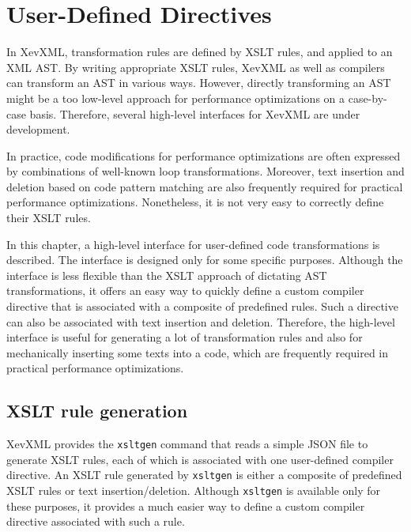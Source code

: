 \chapter{User-Defined Directives}\label{chap:json}


In XevXML, transformation rules are defined by XSLT rules, and applied
to an XML AST. By writing appropriate XSLT rules, XevXML as well as
compilers can transform an AST in various ways.  However, directly
transforming an AST might be a too low-level approach for performance
optimizations on a case-by-case basis.  Therefore, several high-level
interfaces for XevXML are under development.

In practice, code modifications for performance optimizations are often
expressed by combinations of well-known loop transformations.  Moreover,
text insertion and deletion based on code pattern matching are also
frequently required for practical performance optimizations.
Nonetheless, it is not very easy to correctly define their XSLT
rules. 

In this chapter, a high-level interface for user-defined code
transformations is described. The interface is designed only for some
specific purposes.  Although the interface is less flexible than the
XSLT approach of dictating AST transformations, it offers an easy way to
quickly define a custom compiler directive that is associated with a
composite of predefined rules. Such a directive can also be associated
with text insertion and deletion. Therefore, the high-level interface is
useful for generating a lot of transformation rules and also for
mechanically inserting some texts into a code, which are frequently
required in practical performance optimizations.

\section{XSLT rule generation}
XevXML provides the \texttt{xsltgen} command that reads a simple
JSON\cite{json} file to generate XSLT rules, each of which is associated
with one user-defined compiler directive.  An XSLT rule generated by
\texttt{xsltgen} is either a composite of predefined XSLT rules or text
insertion/deletion.  Although \texttt{xsltgen} is available only for
these purposes, it provides a much easier way to define a custom
compiler directive associated with such a rule.

